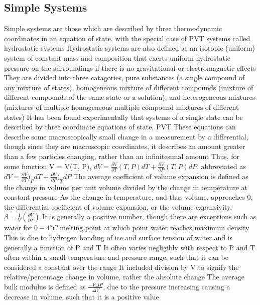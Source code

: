 \subsection{Simple Systems}
\begin{outline*}
\1 Simple systems are those which are described by three thermodynamic coordinates in an equation of state, with the special case of PVT systems called hydrostatic systems
\1 Hydrostatic systems are also defined as an isotopic (uniform) system of constant mass and composition that exerts uniform hydrostatic pressure on the surroundings if there is no gravitational or electromagnetic effects
\2 They are divided into three catagories, pure substances (a single compound of any mixture of states), homogeneous mixture of different compounds (mixture of different compounds of the same state or a solution), and heterogeneous mixtures (mixtures of multiple homogeneous multiple compound mixtures of different states)
\3 It has been found experimentally that systems of a single state can be described by three coordinate equations of state, PVT
\2 These equations can describe some macroscopically small change in a measurement by a differential, though since they are macroscopic coordinates, it describes an amount greater than a few particles changing, rather than an infinitesimal amount
\2 Thus, for some function V = V(T, P), $dV = \frac{\partial V}{\partial T}(T, P)dT + \frac{\partial V}{\partial P}(T, P)dP$, abbreviated as $dV = \frac{\partial V}{\partial T})_PdT + \frac{\partial V}{\partial P})_TdP$
\3 The average coefficient of volume expansion is defined as the change in volume per unit volume divided by the change in temperature at constant pressure
\4 As the change in temperature, and thus volume, approaches 0, the differential coefficient of volume expansion, or the volume expansivity, $\beta = \frac{1}{V}(\frac{\partial V}{\partial T})$
\4 It is generally a positive number, though there are exceptions such as water for $0-4^o C$ melting point at which point water reaches maximum density
\4 This is due to hydrogen bonding of ice and surface tension of water and is generally a function of P and T
\4 It often varies negligibly with respect to P and T often within a small temperature and pressure range, such that it can be considered a constant over the range
\4 It included division by V to signify the relative/percentage change in volume, rather the absolute change
\3 The average bulk modulus is defined as $\frac{-V\Delta P}{\Delta V}$, due to the pressure increasing causing a decrease in volume, such that it is a positive value

\end{outline*}
